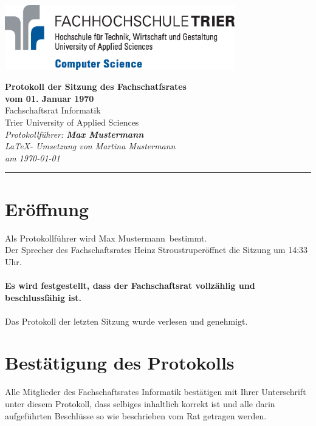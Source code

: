 \documentclass[a4paper, 11pt]{article} %
\newcommand{\protokoller}{Max Mustermann}
\newcommand{\dateOfMeeting}{01. Januar 1970}
\newcommand{\TeXer}{Martina Mustermann}
\newcommand{\fsiPresident}{Heinz Stroustrup}
\begin{document}

\doublespacing
\thispagestyle{empty}

\begin{center}
\includegraphics[width=10.0cm]{../logo_faculty_computer_science.eps}

\vspace*{\fill}
{\LARGE \textbf{Protokoll der Sitzung des Fachschatfsrates \\vom \dateOfMeeting}}\\
Fachschaftsrat Informatik\\
Trier University of Applied Sciences\\
\vspace{2.5cm}
\textit{
	Protokollführer: \textbf{\protokoller} \\
	\LaTeX - Umsetzung von \TeXer\\
	am \today
}
\vfill
\end{center}

\hspace*{-35cm}
\textcolor{fsi}{\rule{64.9cm}{15pt}}
\pagebreak
 
\setcounter{tocdepth}{2}
\tableofcontents 
\pagebreak

\section{Eröffnung}
Als Protokollführer wird \protokoller~bestimmt.\\
Der Sprecher des Fachschaftsrates \fsiPresident eröffnet die Sitzung um 14:33 Uhr.
\\\\
\textbf{Es wird festgestellt, dass der Fachschaftsrat vollzählig und beschlussfähig ist.}
\\\\
Das Protokoll der letzten Sitzung wurde verlesen und genehmigt.

\pagebreak
\section{Bestätigung des Protokolls}
Alle Mitglieder des Fachschaftsrates Informatik bestätigen mit Ihrer Unterschrift unter diesem Protokoll, dass selbiges inhaltlich korrekt ist und alle darin aufgeführten Beschlüsse so wie beschrieben vom Rat getragen werden.
\\
\vspace{1.5cm}
\end{document}
